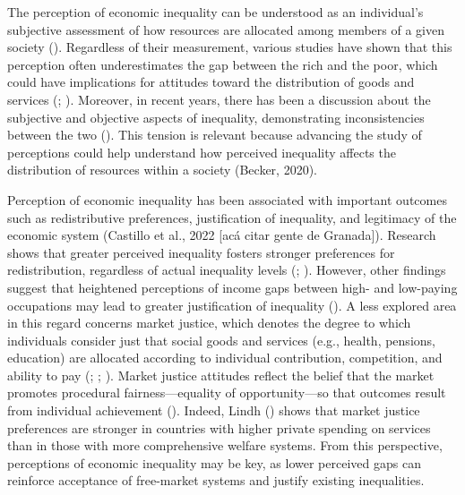 \documentclass[
  12pt,
]{article}
\begin{document}
The perception of economic inequality can be understood as an
individual's subjective assessment of how resources are allocated among
members of a given society (). Regardless of their measurement, various studies have shown that
this perception often underestimates the gap between the rich and the
poor, which could have implications for attitudes toward the
distribution of goods and services
(;
). Moreover, in
recent years, there has been a discussion about the subjective and
objective aspects of inequality, demonstrating inconsistencies between
the two (). This tension is
relevant because advancing the study of perceptions could help
understand how perceived inequality affects the distribution of
resources within a society (Becker, 2020).

Perception of economic inequality has been associated with important
outcomes such as redistributive preferences, justification of
inequality, and legitimacy of the economic system (Castillo et al., 2022
{[}acá citar gente de Granada{]}). Research shows that greater perceived
inequality fosters stronger preferences for redistribution, regardless
of actual inequality levels
(; ). However, other findings suggest that heightened
perceptions of income gaps between high- and low-paying occupations may
lead to greater justification of inequality
(). A less explored area in
this regard concerns market justice, which denotes the degree to which
individuals consider just that social goods and services (e.g., health,
pensions, education) are allocated according to individual contribution,
competition, and ability to pay
(;
;
). Market justice attitudes
reflect the belief that the market promotes procedural
fairness---equality of opportunity---so that outcomes result from
individual achievement ().
Indeed, Lindh () shows that market
justice preferences are stronger in countries with higher private
spending on services than in those with more comprehensive welfare
systems. From this perspective, perceptions of economic inequality may
be key, as lower perceived gaps can reinforce acceptance of free-market
systems and justify existing inequalities.
\end{document}

